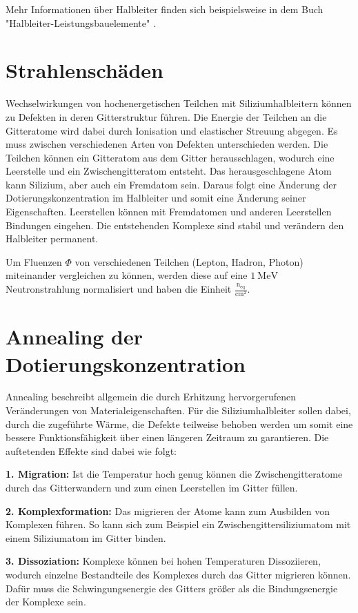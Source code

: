 Mehr Informationen über Halbleiter finden sich beispielsweise in dem Buch "Halbleiter-Leistungsbauelemente"  \cite{semiconductor}.

\section{Strahlenschäden}
Wechselwirkungen von hochenergetischen Teilchen mit Siliziumhalbleitern können zu Defekten in deren
Gitterstruktur führen.
Die Energie der Teilchen an die Gitteratome wird dabei durch Ionisation und elastischer Streuung abgegen.
Es muss zwischen verschiedenen Arten von Defekten unterschieden werden. Die Teilchen können ein Gitteratom aus dem
Gitter herausschlagen, wodurch eine Leerstelle und ein Zwischengitteratom entsteht. Das herausgeschlagene Atom
kann Silizium, aber auch ein Fremdatom sein. Daraus folgt eine Änderung der Dotierungskonzentration im
Halbleiter und somit eine Änderung seiner Eigenschaften.
Leerstellen können mit Fremdatomen und anderen Leerstellen Bindungen eingehen. Die
entstehenden Komplexe sind stabil und verändern den Halbleiter permanent.


Um Fluenzen $ \Phi$ von verschiedenen Teilchen (Lepton, Hadron, Photon) miteinander vergleichen zu können, werden diese
auf eine $\SI{1}{\mega\eV}$ Neutronstrahlung normalisiert und haben die Einheit $\mathrm{\frac{n_{\mathrm{eq}}}{cm^2}}$.


\section{Annealing der Dotierungskonzentration}
Annealing beschreibt allgemein die durch Erhitzung hervorgerufenen Veränderungen von Materialeigenschaften. Für die
Siliziumhalbleiter sollen dabei, durch die zugeführte Wärme, die Defekte teilweise behoben werden um somit eine
bessere Funktionsfähigkeit über einen längeren Zeitraum zu garantieren. Die auftetenden Effekte sind dabei wie folgt:

\textbf{1. Migration:} Ist die Temperatur hoch genug können die Zwischengitteratome durch das Gitterwandern und
zum einen Leerstellen im Gitter füllen.

\textbf{2. Komplexformation:} Das migrieren der Atome kann zum Ausbilden von Komplexen führen. So kann sich zum Beispiel ein
Zwischengittersiliziumatom mit einem Siliziumatom im Gitter binden.

\textbf{3. Dissoziation:} Komplexe können bei hohen Temperaturen Dissoziieren, wodurch einzelne Bestandteile des Komplexes
durch das Gitter migrieren können. Dafür muss die Schwingungsenergie des Gitters größer als die Bindungsenergie der Komplexe sein.

